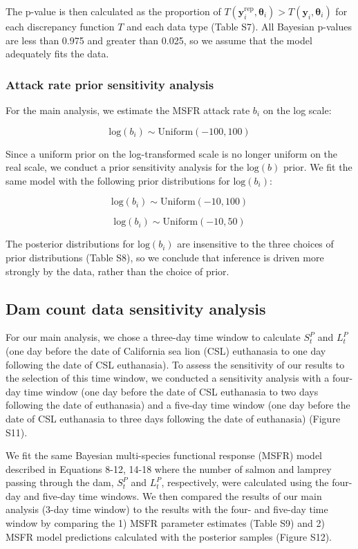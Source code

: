 \documentclass[
]{article}
\begin{document}
The p-value is then calculated as the proportion of
\(T(\textbf{y}_i^{\text{rep}}, \boldsymbol{\theta}_i) >T(\textbf{y}_i, \boldsymbol{\theta}_i)\)
for each discrepancy function \(T\) and each data type (Table S7). All
Bayesian p-values are less than 0.975 and greater than 0.025, so we
assume that the model adequately fits the data.

\subsubsection{Attack rate prior sensitivity
analysis}\label{attack-rate-prior-sensitivity-analysis}

For the main analysis, we estimate the MSFR attack rate \(b_i\) on the
log scale:

\[
\text{log}(b_i) \sim \text{Uniform}(-100, 100)
\]

Since a uniform prior on the log-transformed scale is no longer uniform
on the real scale, we conduct a prior sensitivity analysis for the
\(\text{log}(b)\) prior. We fit the same model with the following prior
distributions for \(\text{log}(b_i)\):

\[
\text{log}(b_i) \sim \text{Uniform}(-10, 100)
\]

\[
\text{log}(b_i) \sim \text{Uniform}(-10, 50)
\]

The posterior distributions for \(\text{log}(b_i)\) are insensitive to
the three choices of prior distributions (Table S8), so we conclude that
inference is driven more strongly by the data, rather than the choice of
prior.

\newpage

\subsection{Dam count data sensitivity
analysis}\label{dam-count-data-sensitivity-analysis}

For our main analysis, we chose a three-day time window to calculate
\(S_t^P\) and \(L_t^P\) (one day before the date of California sea lion
(CSL) euthanasia to one day following the date of CSL euthanasia). To
assess the sensitivity of our results to the selection of this time
window, we conducted a sensitivity analysis with a four-day time window
(one day before the date of CSL euthanasia to two days following the
date of euthanasia) and a five-day time window (one day before the date
of CSL euthanasia to three days following the date of euthanasia)
(Figure S11).

We fit the same Bayesian multi-species functional response (MSFR) model
described in Equations 8-12, 14-18 where the number of salmon and
lamprey passing through the dam, \(S_t^P\) and \(L_t^P\), respectively,
were calculated using the four-day and five-day time windows. We then
compared the results of our main analysis (3-day time window) to the
results with the four- and five-day time window by comparing the 1) MSFR
parameter estimates (Table S9) and 2) MSFR model predictions calculated
with the posterior samples (Figure S12).
\end{document}
